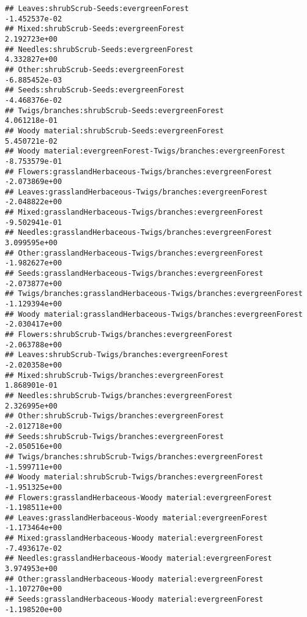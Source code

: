\documentclass[
]{article}
\begin{document}
\begin{verbatim}
## Leaves:shrubScrub-Seeds:evergreenForest                               -1.452537e-02
## Mixed:shrubScrub-Seeds:evergreenForest                                 2.192723e+00
## Needles:shrubScrub-Seeds:evergreenForest                               4.332827e+00
## Other:shrubScrub-Seeds:evergreenForest                                -6.885452e-03
## Seeds:shrubScrub-Seeds:evergreenForest                                -4.468376e-02
## Twigs/branches:shrubScrub-Seeds:evergreenForest                        4.061218e-01
## Woody material:shrubScrub-Seeds:evergreenForest                        5.450721e-02
## Woody material:evergreenForest-Twigs/branches:evergreenForest         -8.753579e-01
## Flowers:grasslandHerbaceous-Twigs/branches:evergreenForest            -2.073869e+00
## Leaves:grasslandHerbaceous-Twigs/branches:evergreenForest             -2.048822e+00
## Mixed:grasslandHerbaceous-Twigs/branches:evergreenForest              -9.502941e-01
## Needles:grasslandHerbaceous-Twigs/branches:evergreenForest             3.099595e+00
## Other:grasslandHerbaceous-Twigs/branches:evergreenForest              -1.982627e+00
## Seeds:grasslandHerbaceous-Twigs/branches:evergreenForest              -2.073877e+00
## Twigs/branches:grasslandHerbaceous-Twigs/branches:evergreenForest     -1.129394e+00
## Woody material:grasslandHerbaceous-Twigs/branches:evergreenForest     -2.030417e+00
## Flowers:shrubScrub-Twigs/branches:evergreenForest                     -2.063788e+00
## Leaves:shrubScrub-Twigs/branches:evergreenForest                      -2.020358e+00
## Mixed:shrubScrub-Twigs/branches:evergreenForest                        1.868901e-01
## Needles:shrubScrub-Twigs/branches:evergreenForest                      2.326995e+00
## Other:shrubScrub-Twigs/branches:evergreenForest                       -2.012718e+00
## Seeds:shrubScrub-Twigs/branches:evergreenForest                       -2.050516e+00
## Twigs/branches:shrubScrub-Twigs/branches:evergreenForest              -1.599711e+00
## Woody material:shrubScrub-Twigs/branches:evergreenForest              -1.951325e+00
## Flowers:grasslandHerbaceous-Woody material:evergreenForest            -1.198511e+00
## Leaves:grasslandHerbaceous-Woody material:evergreenForest             -1.173464e+00
## Mixed:grasslandHerbaceous-Woody material:evergreenForest              -7.493617e-02
## Needles:grasslandHerbaceous-Woody material:evergreenForest             3.974953e+00
## Other:grasslandHerbaceous-Woody material:evergreenForest              -1.107270e+00
## Seeds:grasslandHerbaceous-Woody material:evergreenForest              -1.198520e+00

\end{verbatim}
\end{document}
